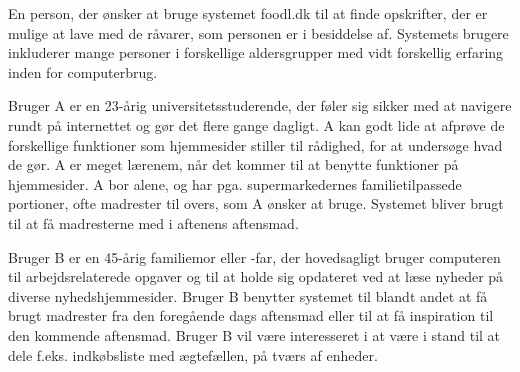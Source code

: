 {En person, der ønsker at bruge systemet foodl.dk til at finde opskrifter, der er mulige at lave med de råvarer, som personen er i besiddelse af.}
{Systemets brugere inkluderer mange personer i forskellige aldersgrupper med vidt forskellig erfaring inden for computerbrug.}
{Bruger A er en 23-årig universitetsstuderende, der føler sig sikker med at navigere rundt på internettet og gør det flere gange dagligt. A kan godt lide at afprøve de forskellige funktioner som hjemmesider stiller til rådighed, for at undersøge hvad de gør. A er meget lærenem, når det kommer til at benytte funktioner på hjemmesider. A bor alene, og har pga. supermarkedernes familietilpassede portioner, ofte madrester til overs, som A ønsker at bruge. Systemet bliver brugt til at få madresterne med i aftenens aftensmad. 

Bruger B er en 45-årig familiemor eller -far, der hovedsagligt bruger computeren til arbejdsrelaterede opgaver og til at holde sig opdateret ved at læse nyheder på diverse nyhedshjemmesider. Bruger B benytter systemet til blandt andet at få brugt madrester fra den foregående dags aftensmad eller til at få inspiration til den kommende aftensmad. Bruger B vil være interesseret i at være i stand til at dele f.eks. indkøbsliste med ægtefællen, på tværs af enheder.}
{}